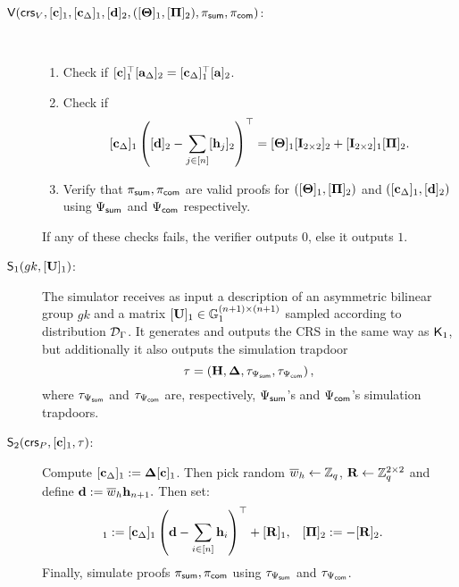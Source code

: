 \begin{description}
\item[{$\mathsf{V}(
    \mathsf{crs}_V,
    [\mathbf{c}]_1,
    [\mathbf{c}_{\Delta}]_1, [\mathbf{d}]_2,
    ([\mathbf{{\Theta}}]_1, [\mathbf{{\Pi}}]_2), 
    \pi_{\mathsf{sum}},\pi_{\mathsf{com}})$:}] ~
\begin{enumerate}
\item  Check if $[\mathbf{c}]_1^\top[\mathbf{a}_\Delta]_2 = [\mathbf{c}_\Delta]_1^\top[\mathbf{a}]_2$. 
\item Check if 
\begin{equation}\label{eq:ver1}[\mathbf{c}_{\Delta}]_1
\left(
    [\mathbf{d}]_2-
    \sum_{j \in [n]} [\mathbf{h}_{j}]_2
\right)^{\top} =
    [\mathbf{{\Theta}}]_1[\mathbf{{I}}_{2 \times 2}]_2 +
    [\mathbf{{I}}_{2 \times 2}]_1[\mathbf{{\Pi}}]_2.
    \end{equation}  
  \item Verify that $\pi_{\mathsf{sum}},\pi_{\mathsf{com}}$ are valid proofs for 
  $([\mathbf{{\Theta}}]_1,[\mathbf{{\Pi}}]_2)$
        and $([\mathbf{c}_\Delta]_1,[\mathbf{d}]_2)$ using $\Psi_{\mathsf{sum}}$ and $\Psi_{\mathsf{com}}$ respectively.
\end{enumerate}
If any of these checks fails, the verifier outputs $0$, else it outputs $1$.
\item[{$\mathsf{S}_1({gk},[\mathbf{{U}}]_1)$:}] The simulator receives as input a description of an asymmetric bilinear group ${gk}$ and a matrix $[\mathbf{{U}}]_1 \in \mathbb{G}_1^{(n+1) \times (n+1)}$ sampled according to distribution $\mathcal{D}_{\Gamma}$. It generates and outputs the CRS in the same way as $\mathsf{K}_1$, but additionally it also  outputs the simulation trapdoor 
$$\tau=\left(\mathbf{{H}}, \mathbf{{\Delta}}, \tau_{\Psi_{\mathsf{sum}}}, \tau_{\Psi_{\mathsf{com}}}\right),$$
where $\tau_{\Psi_{\mathsf{sum}}}$ and $\tau_{\Psi_{\mathsf{com}}}$ are, respectively, ${\Psi_{\mathsf{sum}}}$'s and ${\Psi_{\mathsf{com}}}$'s simulation trapdoors.
\item[{$\mathsf{S}_2(\mathsf{crs}_P,[\mathbf{c}]_1,\tau)$:}] Compute $[\mathbf{c}_{\Delta}]_1:=\mathbf{{\Delta}}[\mathbf{c}]_1$.
      Then pick random $\overline{w}_h \gets \mathbb{Z}_q$, $\mathbf{{R}} \gets \mathbb{Z}_q^{2 \times 2}$ and define 
 $\mathbf{d}:= \overline{w}_{h} \mathbf{h}_{n+1}.$
 Then set:
\begin{align*} 
[\matr{\Theta}]_1 & :=  [\vecb{c}_\Delta]_1 \left(\vecb{d}-\sum_{i \in [n]} \lrck_i\right)^\top + [\matr{R}]_1,
    &
    [\matr{\Pi}]_2 & := - [\matr{R}]_2.
\end{align*}
Finally, simulate proofs $\pi_{\mathsf{sum}},\pi_{\mathsf{com}}$ using $\tau_{\Psi_{\mathsf{sum}}}$ and $\tau_{\Psi_{\mathsf{com}}}$.
\end{description}

